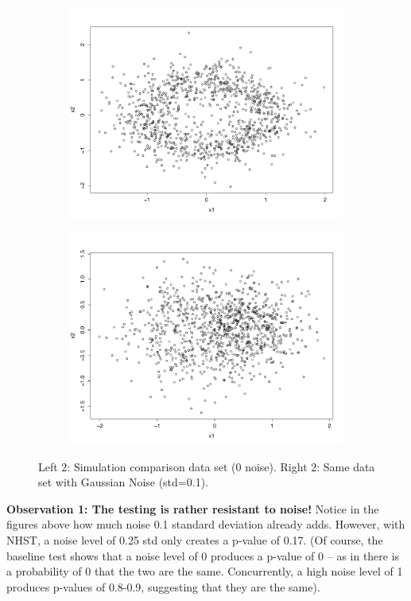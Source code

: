 \documentclass[a4paper]{article}
\begin{document}
\begin{figure}[htp!]
\begin{subfigure}{.25\textwidth}
  \includegraphics[width=\linewidth]{Sept29_3}
\end{subfigure}%
\begin{subfigure}{.25\textwidth}
  \centering
  \includegraphics[width=\linewidth]{Sept29_4}
\end{subfigure}
\caption{Left 2: Simulation comparison data set (0 noise). Right 2: Same data set with Gaussian Noise (std=0.1).}
\end{figure}

\textbf{Observation 1: The testing is rather resistant to noise!} Notice in the figures above how much noise 0.1 standard deviation already adds. However, with NHST, a noise level of 0.25 std only creates a p-value of 0.17. (Of course, the baseline test shows that a noise level of 0 produces a p-value of 0 -- as in there is a probability of 0 that the two are the same. Concurrently, a high noise level of 1 produces p-values of 0.8-0.9, suggesting that they are the same). 
\end{document}
